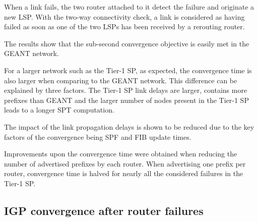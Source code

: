 \documentclass[a4paper, 11pt, UTF8]{article}
\begin{document}
When a link fails, the two router attached to it detect the failure and originate a new LSP. 
With the two-way connectivity check, 
a link is considered as having failed as soon as one of the two LSPs has been received by a rerouting router.

The results show that the sub-second convergence objective is easily met in the GEANT network.

For a larger network such as the Tier-1 SP, as expected, the convergence time is also larger when comparing to the GEANT network.
This difference can be explained by three factors.
The Tier-1 SP link delays are larger, contains more prefixes than GEANT and the larger number of nodes present in the Tier-1 SP leads to a longer SPT computation.

The impact of the link propagation delays is shown to be reduced due to the key factors of the convergence being SPF and FIB update times.

Improvements upon the convergence time were obtained when reducing the number of advertised prefixes by each router. When advertising one prefix per router, convergence time is halved for nearly all the considered failures in the Tier-1 SP.

\subsection{IGP convergence after router failures}
\end{document}
